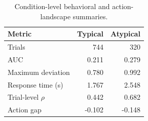 \begin{table}[htbp]
\centering
\caption{Condition-level behavioral and action-landscape summaries.}
\label{tab:condition-summary}
\begin{tabular}{l r r}
\toprule
Metric & Typical & Atypical \\
\midrule
Trials & 744 & 320 \\
AUC & 0.211 & 0.279 \\
Maximum deviation & 0.780 & 0.992 \\
Response time (s) & 1.767 & 2.548 \\
Trial-level $\rho$ & 0.442 & 0.682 \\
Action gap & -0.102 & -0.148 \\
\bottomrule
\end{tabular}
\end{table}
